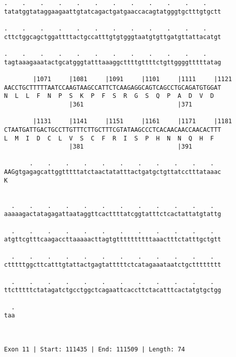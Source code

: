 \documentclass{article}
\begin{document}
\begin{Verbatim}
.    .    .    .    .    .    .    .    .    .    .    .    
tatatggtataggaagaattgtatcagactgatgaaccacagtatgggtgctttgtgctt
                                                            
.    .    .    .    .    .    .    .    .    .    .    .    
cttctggcagctggattttactgccatttgtgtgggtaatgtgttgatgttattacatgt
                                                            
.    .    .    .    .    .    .    .    .    .    .    .    
tagtaaagaaatactgcatgggtatttaaaggcttttgttttctgttggggtttttatag
                                                            
        |1071     |1081     |1091     |1101     |1111     |1121
AACCTGCTTTTTAATCCAAGTAAGCCATTCTCAAGAGGCAGTCAGCCTGCAGATGTGGAT
N  L  L  F  N  P  S  K  P  F  S  R  G  S  Q  P  A  D  V  D  
                  |361                          |371        
  
        |1131     |1141     |1151     |1161     |1171     |1181
CTAATGATTGACTGCCTTGTTTCTTGCTTTCGTATAAGCCCTCACAACAACCAACACTTT
L  M  I  D  C  L  V  S  C  F  R  I  S  P  H  N  N  Q  H  F  
                  |381                          |391        
  
       .    .    .    .    .    .    .    .    .    .    .  
AAGgtgagagcattggtttttatctaactatatttactgatgctgttatcctttataaac
K                                                           
                                                            
  
  .    .    .    .    .    .    .    .    .    .    .    .  
aaaaagactatagagattaataggttcacttttatcggtatttctcactattatgtattg
                                                            
  .    .    .    .    .    .    .    .    .    .    .    .  
atgttcgtttcaagaccttaaaaacttagtgttttttttttaaactttctatttgctgtt
                                                            
  .    .    .    .    .    .    .    .    .    .    .    .  
ctttttggcttcatttgtattactgagtatttttctcatagaaataatctgctttttttt
                                                            
  .    .    .    .    .    .    .    .    .    .    .    .  
ttctttttctatagatctgcctggctcagaattcaccttctacatttcactatgtgctgg
                                                            
  .
taa
   
   
 
Exon 11 | Start: 111435 | End: 111509 | Length: 74




\end{Verbatim}
\end{document}

